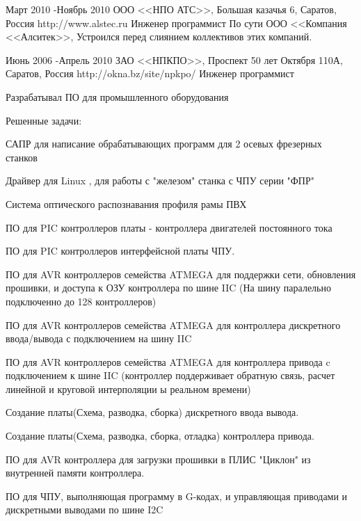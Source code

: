 
\job
{Март 2010 -}{Ноябрь 2010}
{ООО <<НПО АТС>>, Большая казачья 6, Саратов, Россия}
{http://www.alstec.ru}
{Инженер программист}
{По сути ООО <<Компания <<Алситек>>, Устроился перед слиянием коллективов этих компаний.}


\job
{Июнь 2006 -}{Апрель 2010}
{ЗАО <<НПКПО>>, Проспект 50 лет Октября 110А, Саратов, Россия}
{http://okna.bz/site/npkpo/}
{Инженер программист}
{Разрабатывал ПО для промышленного оборудования

Решенные задачи:
\begin{itemize-noindent}
\item{САПР для написание обрабатывающих программ для 2 осевых фрезерных станков}
\item{Драйвер для Linux , для работы с "железом" станка с ЧПУ серии "ФПР"}
\item{Система оптического распознавания профиля рамы ПВХ}
\item{ПО для PIC контроллеров платы - контроллера двигателей постоянного тока }
\item{ПО для PIC контроллеров интерфейсной платы ЧПУ. }
\item{ПО для AVR контроллеров семейства ATMEGA для поддержки сети, обновления прошивки, и доступа к ОЗУ контроллера по шине IIC (На шину паралельно подключенно до 128 контроллеров)}
\item{ПО для AVR контроллеров семейства ATMEGA для контроллера дискретного ввода/вывода с подключением на шину IIC }
\item{ПО для AVR контроллеров семейства ATMEGA для контроллера привода c подключением к шине IIC (контроллер поддерживает обратную связь, расчет линейной и круговой интерполяции ы реальном времени) }
\item{Создание платы(Схема, разводка, сборка) дискретного ввода вывода. }
\item{Создание платы(Схема, разводка, сборка, отладка) контроллера привода. }
\item{ПО для AVR контроллера для загрузки прошивки в ПЛИС "Циклон" из внутренней памяти контроллера. }
\item{ПО для ЧПУ, выполняющая программу в G-кодах, и управляющая приводами и дискретными выводами по шине I2C}

\end{itemize-noindent}
}


